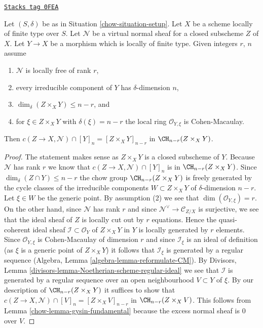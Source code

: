 \begin{lemma}
\label{chow-lemma-gysin-easy}
\href{https://stacks.math.columbia.edu/tag/0FEA}{\texttt{Stacks tag 0FEA}}

Let $(S, \delta)$ be as in Situation \ref{chow-situation-setup}. Let $X$ be a scheme
locally of finite type over $S$. Let $\mathcal{N}$ be a virtual normal
sheaf for a closed subscheme $Z$ of $X$. Let $Y \to X$ be a morphism
which is locally of finite type. Given integers $r$, $n$ assume
\begin{enumerate}
\item $\mathcal{N}$ is locally free of rank $r$,
\item every irreducible component of $Y$ has $\delta$-dimension $n$,
\item $\dim_\delta(Z \times_X Y) \leq n - r$, and
\item for $\xi \in Z \times_X Y$ with $\delta(\xi) = n - r$
the local ring $\mathcal{O}_{Y, \xi}$ is Cohen-Macaulay.
\end{enumerate}
Then $c(Z \to X, \mathcal{N}) \cap [Y]_n = [Z \times_X Y]_{n - r}$
in $\CH_{n - r}(Z \times_X Y)$.
\end{lemma}

\begin{proof}

The statement makes sense as $Z \times_X Y$ is a closed subscheme of $Y$.
Because $\mathcal{N}$ has rank $r$ we know that
$c(Z \to X, \mathcal{N}) \cap [Y]_n$ is in $\CH_{n - r}(Z \times_X Y)$.
Since $\dim_\delta(Z \cap Y) \leq n - r$ the chow group
$\CH_{n - r}(Z \times_X Y)$ is freely generated by the
cycle classes of the irreducible components $W \subset Z \times_X Y$
of $\delta$-dimension $n - r$. Let $\xi \in W$ be the generic point.
By assumption (2) we see that $\dim(\mathcal{O}_{Y, \xi}) = r$.
On the other hand, since $\mathcal{N}$ has rank $r$ and since
$\mathcal{N}^\vee \to \mathcal{C}_{Z/X}$ is surjective, we see that
the ideal sheaf of $Z$ is locally cut out by $r$ equations.
Hence the quasi-coherent ideal sheaf $\mathcal{I} \subset \mathcal{O}_Y$
of $Z \times_X Y$ in $Y$ is locally generated by $r$ elements.
Since $\mathcal{O}_{Y, \xi}$ is Cohen-Macaulay of dimension $r$
and since $\mathcal{I}_\xi$ is an ideal of definition (as $\xi$ is
a generic point of $Z \times_X Y$) it follows that $\mathcal{I}_\xi$
is generated by a regular sequence
(Algebra, Lemma \ref{algebra-lemma-reformulate-CM}).
By Divisors, Lemma \ref{divisors-lemma-Noetherian-scheme-regular-ideal}
we see that $\mathcal{I}$ is generated by a regular sequence over
an open neighbourhood $V \subset Y$ of $\xi$. By our description of
$\CH_{n - r}(Z \times_X Y)$ it suffices to show that
$c(Z \to X, \mathcal{N}) \cap [V]_n = [Z \times_X V]_{n - r}$
in $\CH_{n - r}(Z \times_X V)$. This follows from
Lemma \ref{chow-lemma-gysin-fundamental}
because the excess normal sheaf is $0$ over $V$.
\end{proof}

